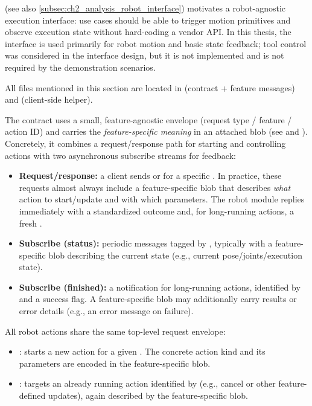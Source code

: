  (see also \autoref{subsec:ch2_analysis_robot_interface}) motivates a robot-agnostic execution interface: use cases should be able to trigger motion primitives and observe execution state without hard-coding a vendor API. In this thesis, the interface is used primarily for robot motion and basic state feedback; tool control was considered in the interface design, but it is not implemented and is not required by the demonstration scenarios.

All files mentioned in this section are located in  (contract + feature messages) and  (client-side helper).

The contract uses a small, feature-agnostic envelope (request type / feature / action ID) and carries the \emph{feature-specific meaning} in an attached blob (see  and ). Concretely, it combines a request/response path for starting and controlling actions with two asynchronous subscribe streams for feedback:
\begin{itemize}
    \item \textbf{Request/response:} a client sends  or  for a specific . In practice, these requests almost always include a feature-specific blob that describes \emph{what} action to start/update and with which parameters. The robot module replies immediately with a standardized outcome and, for long-running actions, a fresh .
    \item \textbf{Subscribe (status):} periodic  messages tagged by , typically with a feature-specific blob describing the current state (e.g., current pose/joints/execution state).
    \item \textbf{Subscribe (finished):} a  notification for long-running actions, identified by  and a success flag. A feature-specific blob may additionally carry results or error details (e.g., an error message on failure).
\end{itemize}

All robot actions share the same top-level request envelope:
\begin{itemize}
    \item {}: starts a new action for a given . The concrete action kind and its parameters are encoded in the feature-specific blob.
    \item {}: targets an already running action identified by  (e.g., cancel or other feature-defined updates), again described by the feature-specific blob.
\end{itemize}

